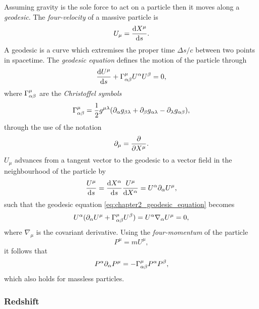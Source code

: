 Assuming gravity is the sole force to act on a particle then it moves along a \emph{geodesic}.
The \emph{four-velocity} of a massive particle is
%
\begin{equation}
	U_{\mu}
	= \dv{X^{\mu}}{s}.
\end{equation}
%
A geodesic is a curve which extremises the proper time \(\Delta s/c\) between two points in spacetime. The \emph{geodesic equation} defines the motion of the particle through
%
\begin{equation}\label{eq:chapter2_geodesic_equation}
	\dv{U^{\mu}}{s} + \Gamma^{\mu}_{\alpha\beta} U^{\alpha} U^{\beta}
	= 0,
\end{equation}
%
where \(\Gamma^{\mu}_{\alpha\beta}\) are the \emph{Christoffel symbols}
%
\begin{equation}
	\Gamma^{\mu}_{\alpha\beta}
	= \frac{1}{2} g^{\mu\lambda}
	(\partial_{\alpha}g_{\beta\lambda}
	+ \partial_{\beta}g_{\alpha\lambda}
	- \partial_{\lambda}g_{\alpha\beta}),
\end{equation}
%
through the use of the notation
%
\begin{equation}
	\partial_{\mu}
	= \pdv{X^{\mu}}.
\end{equation}
%
\(U_{\mu}\) advances from a tangent vector to the geodesic to a vector field in the neighbourhood of the particle by
%
\begin{equation}
	\frac{U^{\mu}}{\dd{s}}
	= \dv{X^{\alpha}}{s} \frac{U^{\mu}}{\dd{X^{\alpha}}}
	= U^{\alpha} \partial_{\alpha} U^{\mu},
\end{equation}
%
such that the geodesic equation \cref{eq:chapter2_geodesic_equation} becomes
%
\begin{equation}\label{eq:chapter2_geodesic_covariant}
	U^{\alpha} (\partial_{\alpha} U^{\mu} + \Gamma^{\mu}_{\alpha\beta} U^{\beta})
	= U^{\alpha} \nabla_{\alpha} U^{\mu}
	= 0,
\end{equation}
%
where \(\nabla_{\mu}\) is the covariant derivative.
Using the \emph{four-momentum} of the particle
%
\begin{equation}
	P^{\mu}
	= m U^{\mu},
\end{equation}
%
it follows that
%
\begin{equation}
	P^{\alpha} \partial_{\alpha} P^{\mu}
	= -\Gamma^{\mu}_{\alpha\beta} P^{\alpha} P^{\beta},
\end{equation}
%
which also holds for massless particles.

\subsubsection{Redshift}

